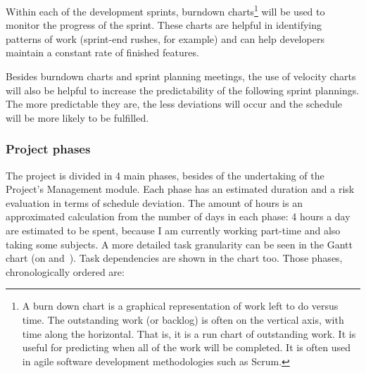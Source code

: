 Within each of the development sprints, burndown charts\footnote{A burn down chart is a graphical representation of work left to do versus time. The outstanding work (or backlog) is often on the vertical axis, with time along the horizontal. That is, it is a run chart of outstanding work. It is useful for predicting when all of the work will be completed. It is often used in agile software development methodologies such as Scrum.} will be used to monitor the progress of the sprint. These charts are helpful in identifying patterns of work (sprint-end rushes, for example) and can help developers maintain a constant rate of finished features.

Besides burndown charts and sprint planning meetings, the use of velocity charts will also be helpful to increase the predictability of the following sprint plannings. The more predictable they are, the less deviations will occur and the schedule will be more likely to be fulfilled.

\subsubsection{Project phases}

The project is divided in 4 main phases, besides of the undertaking of the Project's Management module. Each phase has an estimated duration and a risk evaluation in terms of schedule deviation. The amount of hours is an approximated calculation from the number of days in each phase: 4 hours a day are estimated to be spent, because I am currently working part-time and also taking some subjects. A more detailed task granularity can be seen in the Gantt chart (on  and~). Task dependencies are shown in the chart too. Those phases, chronologically ordered are:

